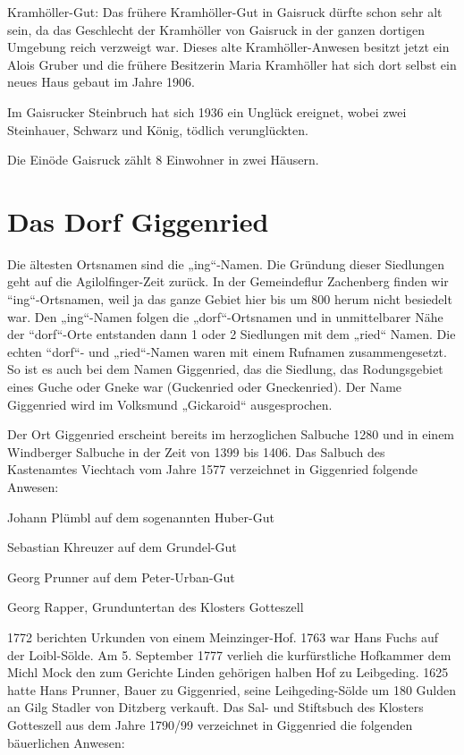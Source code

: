 \documentclass[12pt,a4pager]{book}
\begin{document}
Kramhöller-Gut: Das frühere Kramhöller-Gut in Gaisruck dürfte schon sehr alt
sein, da das Geschlecht der Kramhöller von Gaisruck in der ganzen dortigen
Umgebung reich verzweigt war. Dieses alte Kramhöller-Anwesen besitzt jetzt ein
Alois Gruber und die frühere Besitzerin Maria Kramhöller hat sich dort selbst
ein neues Haus gebaut im Jahre 1906.

Im Gaisrucker Steinbruch hat sich 1936 ein Unglück ereignet, wobei zwei
Steinhauer, Schwarz und König, tödlich verunglückten.

Die Einöde Gaisruck zählt 8 Einwohner in zwei Häusern.

\section{Das Dorf Giggenried}

Die ältesten Ortsnamen sind die „ing“-Namen. Die Gründung dieser Siedlungen geht
auf die Agilolfinger-Zeit zurück. In der Gemeindeflur Zachenberg finden wir
“ing“-Ortsnamen, weil ja das ganze Gebiet hier bis um 800 herum nicht besiedelt
war. Den „ing“-Namen folgen die „dorf“-Ortsnamen und in unmittelbarer Nähe der
“dorf“-Orte entstanden dann 1 oder 2 Siedlungen mit dem „ried“ Namen. Die echten
“dorf“- und „ried“-Namen waren mit einem Rufnamen zusammengesetzt. So ist es
auch bei dem Namen Giggenried, das die Siedlung, das Rodungsgebiet eines Guche
oder Gneke war (Guckenried oder Gneckenried). Der Name Giggenried wird im
Volksmund „Gickaroid“ ausgesprochen.

Der Ort Giggenried erscheint bereits im herzoglichen Salbuche 1280 und in einem
Windberger Salbuche in der Zeit von 1399 bis 1406. Das Salbuch des Kastenamtes
Viechtach vom Jahre 1577 verzeichnet in Giggenried folgende Anwesen:

Johann Plümbl auf dem sogenannten Huber-Gut

Sebastian Khreuzer auf dem Grundel-Gut

Georg Prunner auf dem Peter-Urban-Gut

Georg Rapper, Grunduntertan des Klosters Gotteszell

1772 berichten Urkunden von einem Meinzinger-Hof. 1763 war Hans Fuchs auf der
Loibl-Sölde. Am 5. September 1777 verlieh die kurfürstliche Hofkammer dem Michl
Mock den zum Gerichte Linden gehörigen halben Hof zu Leibgeding. 1625 hatte Hans
Prunner, Bauer zu Giggenried, seine Leihgeding-Sölde um 180 Gulden an Gilg
Stadler von Ditzberg verkauft. Das Sal- und Stiftsbuch des Klosters Gotteszell
aus dem Jahre 1790/99 verzeichnet in Giggenried die folgenden bäuerlichen
Anwesen:
\end{document}
